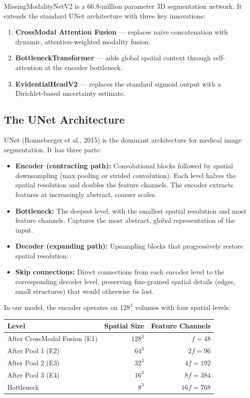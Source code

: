 \documentclass[12pt,a4paper]{article}
\begin{document}
MissingModalityNetV2 is a 66.8-million parameter 3D segmentation network. It extends the standard UNet architecture with three key innovations:

\begin{enumerate}[noitemsep]
  \item \textbf{CrossModal Attention Fusion} --- replaces naive concatenation with dynamic, attention-weighted modality fusion.
  \item \textbf{BottleneckTransformer} --- adds global spatial context through self-attention at the encoder bottleneck.
  \item \textbf{EvidentialHeadV2} --- replaces the standard sigmoid output with a Dirichlet-based uncertainty estimate.
\end{enumerate}

\subsection{The UNet Architecture}

UNet (Ronneberger et al., 2015) is the dominant architecture for medical image segmentation. It has three parts:

\begin{itemize}[noitemsep]
  \item \textbf{Encoder (contracting path):} Convolutional blocks followed by spatial downsampling (max pooling or strided convolution). Each level halves the spatial resolution and doubles the feature channels. The encoder extracts features at increasingly abstract, coarser scales.

  \item \textbf{Bottleneck:} The deepest level, with the smallest spatial resolution and most feature channels. Captures the most abstract, global representation of the input.

  \item \textbf{Decoder (expanding path):} Upsampling blocks that progressively restore spatial resolution.

  \item \textbf{Skip connections:} Direct connections from each encoder level to the corresponding decoder level, preserving fine-grained spatial details (edges, small structures) that would otherwise be lost.
\end{itemize}

In our model, the encoder operates on $128^3$ volumes with four spatial levels:

\begin{center}
\begin{tabular}{lrr}
\toprule
Level & Spatial Size & Feature Channels \\
\midrule
After CrossModal Fusion (E1) & $128^3$ & $f = 48$ \\
After Pool 1 (E2) & $64^3$ & $2f = 96$ \\
After Pool 2 (E3) & $32^3$ & $4f = 192$ \\
After Pool 3 (E4) & $16^3$ & $8f = 384$ \\
Bottleneck & $8^3$ & $16f = 768$ \\
\bottomrule
\end{tabular}
\end{center}
\end{document}
